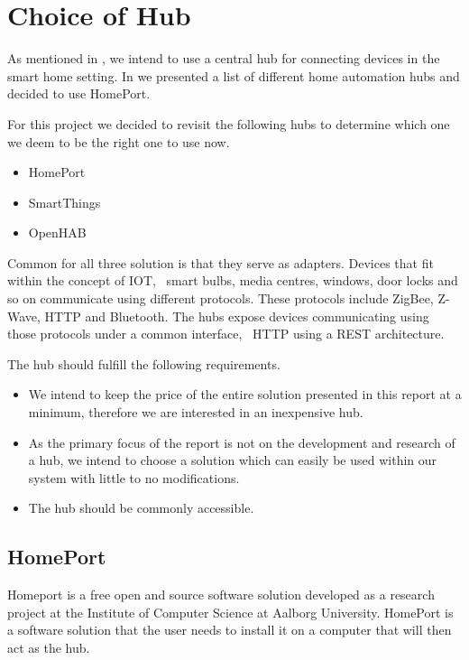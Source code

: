 \section{Choice of Hub}
\label{sec:analysis:choice-of-hub}

As mentioned in , we intend to use a central hub for connecting devices in the smart home setting. In \cite{prespecialisation} we presented a list of different home automation hubs and decided to use HomePort.

For this project we decided to revisit the following hubs to determine which one we deem to be the right one to use now.

\begin{itemize}
    \item HomePort
    \item SmartThings
    \item OpenHAB
\end{itemize}

Common for all three solution is that they serve as adapters. Devices that fit within the concept of IOT, \eg~smart bulbs, media centres, windows, door locks and so on communicate using different protocols. These protocols include ZigBee, Z-Wave, HTTP and Bluetooth. The hubs expose devices communicating using those protocols under a common interface, \eg~HTTP using a REST architecture.

The hub should fulfill the following requirements.

\begin{itemize}
\item We intend to keep the price of the entire solution presented in this report at a minimum, therefore we are interested in an inexpensive hub.
\item As the primary focus of the report is not on the development and research of a hub, we intend to choose a solution which can easily be used within our system with little to no modifications.
\item The hub should be commonly accessible.
\end{itemize}

\subsection{HomePort}
\label{sec:analysis:choice-of-hub:homeport}

Homeport \cite{HOMEPORT10,homeport:github} is a free open and source software solution developed as a research project at the Institute of Computer Science at Aalborg University.
HomePort is a software solution that the user needs to install it on a computer that will then act as the hub.

